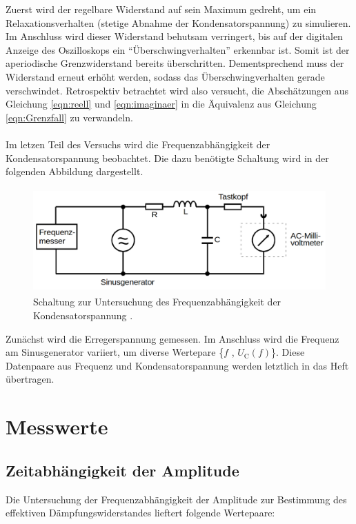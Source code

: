 \noindent Zuerst wird der regelbare Widerstand auf sein Maximum gedreht, um ein Relaxationsverhalten (stetige Abnahme der
Kondensatorspannung) zu simulieren. Im Anschluss wird dieser Widerstand behutsam verringert, bis auf der digitalen Anzeige 
des Oszilloskops ein \enquote{Überschwingverhalten} erkennbar ist. Somit ist der aperiodische Grenzwiderstand bereits überschritten.
Dementsprechend muss der Widerstand erneut erhöht werden, sodass das Überschwingverhalten gerade verschwindet. Retrospektiv 
betrachtet wird also versucht, die Abschätzungen aus Gleichung \eqref{eqn:reell} und \eqref{eqn:imaginaer} in die Äquivalenz 
aus Gleichung \eqref{eqn:Grenzfall} zu verwandeln.\\\\

\noindent Im letzen Teil des Versuchs wird die Frequenzabhängigkeit der Kondensatorspannung beobachtet. Die dazu 
benötigte Schaltung wird in der folgenden Abbildung dargestellt.

\begin{figure}[H]
    \centering
    \includegraphics[height=4cm]{5c.png}
    \caption{Schaltung zur Untersuchung des Frequenzabhängigkeit der Kondensatorspannung \cite{Versuchsanleitung_v354}.}
    \label{fig:5c}
\end{figure}

\noindent Zunächst wird die Erregerspannung gemessen. Im Anschluss wird die Frequenz am Sinusgenerator variiert, um 
diverse Wertepare \{$f$ , $U_\text{C}(f)$\}. Diese Datenpaare aus Frequenz und Kondensatorspannung werden letztlich in 
das Heft übertragen.

\section{Messwerte}

\subsection{Zeitabhängigkeit der Amplitude}

Die Untersuchung der Frequenzabhängigkeit der Amplitude zur Bestimmung des effektiven Dämpfungswiderstandes lieftert
folgende Wertepaare:

